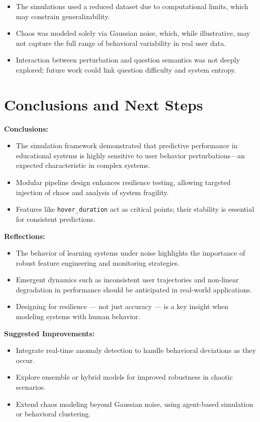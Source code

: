 \documentclass[12pt]{article}
\begin{document}
\begin{itemize}
	\item The simulations used a reduced dataset due to computational limits, which may constrain generalizability.
	\item Chaos was modeled solely via Gaussian noise, which, while illustrative, may not capture the full range of behavioral variability in real user data.
	\item Interaction between perturbation and question semantics was not deeply explored; future work could link question difficulty and system entropy.
\end{itemize}
	
\section{Conclusions and Next Steps}

\textbf{Conclusions:}
\begin{itemize}
	\item The simulation framework demonstrated that predictive performance in educational systems is highly sensitive to user behavior perturbations—an expected characteristic in complex systems.
	\item Modular pipeline design enhances resilience testing, allowing targeted injection of chaos and analysis of system fragility.
	\item Features like \texttt{hover\_duration} act as critical points; their stability is essential for consistent predictions.
\end{itemize}

\textbf{Reflections:}
\begin{itemize}
	\item The behavior of learning systems under noise highlights the importance of robust feature engineering and monitoring strategies.
	\item Emergent dynamics such as inconsistent user trajectories and non-linear degradation in performance should be anticipated in real-world applications.
	\item Designing for resilience — not just accuracy — is a key insight when modeling systems with human behavior.
\end{itemize}

\textbf{Suggested Improvements:}
\begin{itemize}
	\item Integrate real-time anomaly detection to handle behavioral deviations as they occur.
	\item Explore ensemble or hybrid models for improved robustness in chaotic scenarios.
	\item Extend chaos modeling beyond Gaussian noise, using agent-based simulation or behavioral clustering.
\end{itemize}
	
\end{document}
